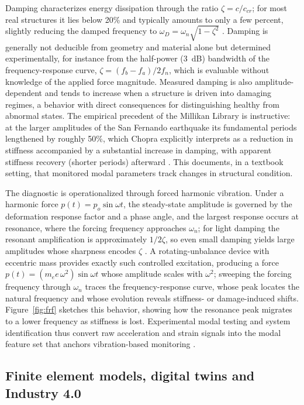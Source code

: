 Damping characterizes energy dissipation through the ratio $\zeta = c/c_{cr}$; for most real structures it lies below 20\% and typically amounts to only a few percent, slightly reducing the damped frequency to $\omega_D = \omega_n\sqrt{1-\zeta^2}$ \citep{chopra2017dynamics}. Damping is generally not deducible from geometry and material alone but determined experimentally, for instance from the half-power (3~dB) bandwidth of the frequency-response curve, $\zeta = (f_b - f_a)/2f_n$, which is evaluable without knowledge of the applied force magnitude. Measured damping is also amplitude-dependent and tends to increase when a structure is driven into damaging regimes, a behavior with direct consequences for distinguishing healthy from abnormal states. The empirical precedent of the Millikan Library is instructive: at the larger amplitudes of the San Fernando earthquake its fundamental periods lengthened by roughly 50\%, which Chopra explicitly interprets as a reduction in stiffness accompanied by a substantial increase in damping, with apparent stiffness recovery (shorter periods) afterward \citep{chopra2017dynamics}. This documents, in a textbook setting, that monitored modal parameters track changes in structural condition.

The diagnostic is operationalized through forced harmonic vibration. Under a harmonic force $p(t) = p_o\sin\omega t$, the steady-state amplitude is governed by the deformation response factor and a phase angle, and the largest response occurs at resonance, where the forcing frequency approaches $\omega_n$; for light damping the resonant amplification is approximately $1/2\zeta$, so even small damping yields large amplitudes whose sharpness encodes $\zeta$ \citep{chopra2017dynamics}. A rotating-unbalance device with eccentric mass provides exactly such controlled excitation, producing a force $p(t) = (m_e e\,\omega^2)\sin\omega t$ whose amplitude scales with $\omega^2$; sweeping the forcing frequency through $\omega_n$ traces the frequency-response curve, whose peak locates the natural frequency and whose evolution reveals stiffness- or damage-induced shifts. Figure~\ref{fig:frf} sketches this behavior, showing how the resonance peak migrates to a lower frequency as stiffness is lost. Experimental modal testing and system identification thus convert raw acceleration and strain signals into the modal feature set that anchors vibration-based monitoring \citep{yu2024steelbridge}.

\subsection{Finite element models, digital twins and Industry 4.0}\label{subsec:fem-dt}

